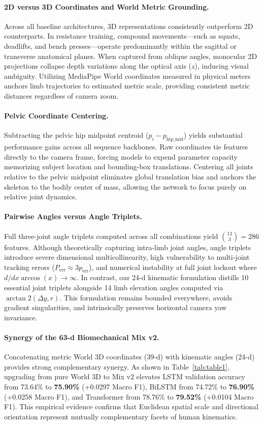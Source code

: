 \documentclass[preprint,12pt]{elsarticle}
\begin{document}
\paragraph{2D versus 3D Coordinates and World Metric Grounding.} Across all baseline architectures, 3D representations consistently outperform 2D counterparts. In resistance training, compound movements---such as squats, deadlifts, and bench presses---operate predominantly within the sagittal or transverse anatomical planes. When captured from oblique angles, monocular 2D projections collapse depth variations along the optical axis ($z$), inducing visual ambiguity. Utilizing MediaPipe World coordinates measured in physical meters anchors limb trajectories to estimated metric scale, providing consistent metric distances regardless of camera zoom.

\paragraph{Pelvic Coordinate Centering.} Subtracting the pelvic hip midpoint centroid ($p_i - p_{\text{hip\_mid}}$) yields substantial performance gains across all sequence backbones. Raw coordinates tie features directly to the camera frame, forcing models to expend parameter capacity memorizing subject location and bounding-box translations. Centering all joints relative to the pelvic midpoint eliminates global translation bias and anchors the skeleton to the bodily center of mass, allowing the network to focus purely on relative joint dynamics.

\paragraph{Pairwise Angles versus Angle Triplets.} Full three-joint angle triplets computed across all combinations yield $\binom{13}{3} = 286$ features. Although theoretically capturing intra-limb joint angles, angle triplets introduce severe dimensional multicollinearity, high vulnerability to multi-joint tracking errors ($P_{\text{err}} \approx 3p_{\text{err}}$), and numerical instability at full joint lockout where $d/dx \arccos(x) \to \infty$. In contrast, our 24-d kinematic formulation distills 10 essential joint triplets alongside 14 limb elevation angles computed via $\arctan2(\Delta y, r)$. This formulation remains bounded everywhere, avoids gradient singularities, and intrinsically preserves horizontal camera yaw invariance.

\paragraph{Synergy of the 63-d Biomechanical Mix v2.} Concatenating metric World 3D coordinates (39-d) with kinematic angles (24-d) provides strong complementary synergy. As shown in Table~\ref{tab:table1}, upgrading from pure World 3D to Mix v2 elevates LSTM validation accuracy from 73.64\% to \textbf{75.90\%} (+0.0297 Macro F1), BiLSTM from 74.72\% to \textbf{76.90\%} (+0.0258 Macro F1), and Transformer from 78.76\% to \textbf{79.52\%} (+0.0104 Macro F1). This empirical evidence confirms that Euclidean spatial scale and directional orientation represent mutually complementary facets of human kinematics.
\end{document}
